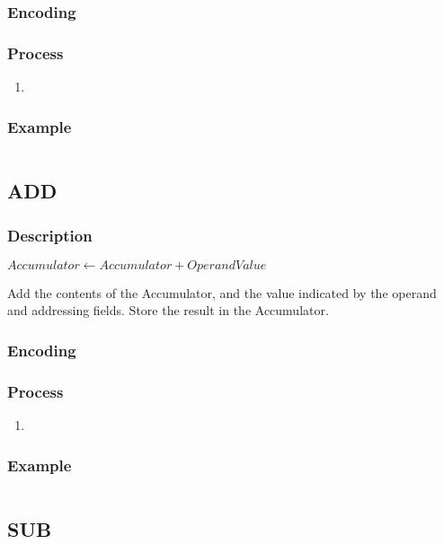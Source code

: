     \subsubsection{Encoding}
    \subsubsection{Process}
    \begin{enumerate}
        \item
    \end{enumerate}

    \subsubsection{Example}
    \begin{verbatim}
    \end{verbatim}

\subsection{ADD}\label{subsec:add}
    \subsubsection{Description}
    $Accumulator \leftarrow Accumulator + OperandValue$
    \par Add the contents of the Accumulator, and the value indicated by the operand and addressing fields.
    Store the result in the Accumulator.

    \subsubsection{Encoding}
    \subsubsection{Process}
    \begin{enumerate}
        \item
    \end{enumerate}

    \subsubsection{Example}
    \begin{verbatim}
    \end{verbatim}

\subsection{SUB}\label{subsec:sub}
